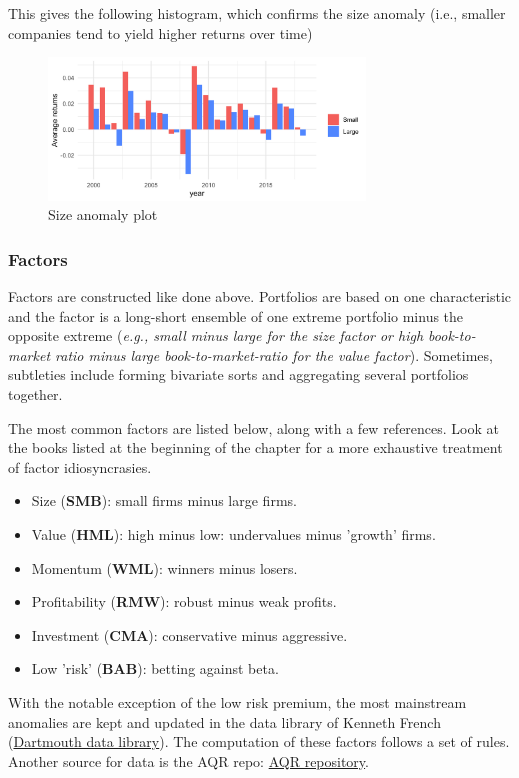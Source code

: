 This gives the following histogram, which confirms the size anomaly (i.e., smaller companies tend to yield higher returns over time)
\begin{figure}[H]
    \caption{Size anomaly plot}
    \centering
    \includegraphics[width=0.75\textwidth]{part_1/images/size_anomaly.png}
\end{figure}


\subsubsection{Factors}
Factors are constructed like done above. Portfolios are based on one characteristic and the factor is a long-short ensemble of one extreme portfolio minus the opposite extreme (\textit{e.g., small minus large for the size factor or high book-to-market ratio minus large book-to-market-ratio for the value factor}). Sometimes, subtleties include forming bivariate sorts and aggregating several portfolios together. 

The most common factors are listed below, along with a few references. Look at the books listed at the beginning of the chapter for a more exhaustive treatment of factor idiosyncrasies.
\begin{itemize}
    \item Size (\textbf{SMB}): small firms minus large firms.
    \item Value (\textbf{HML}): high minus low: undervalues minus 'growth' firms.
    \item Momentum (\textbf{WML}): winners minus losers.
    \item Profitability (\textbf{RMW}): robust minus weak profits.
    \item Investment (\textbf{CMA}): conservative minus aggressive.
    \item Low 'risk' (\textbf{BAB}): betting against beta.
\end{itemize}

With the notable exception of the low risk premium, the most mainstream anomalies are kept and updated in the data library of Kenneth French (\href{https://mba.tuck.dartmouth.edu/pages/faculty/ken.french/data_library.html}{Dartmouth data library}). The computation of these factors follows a set of rules. Another source for data is the AQR repo: \href{https://www.aqr.com/Insights/Datasets}{AQR repository}.

